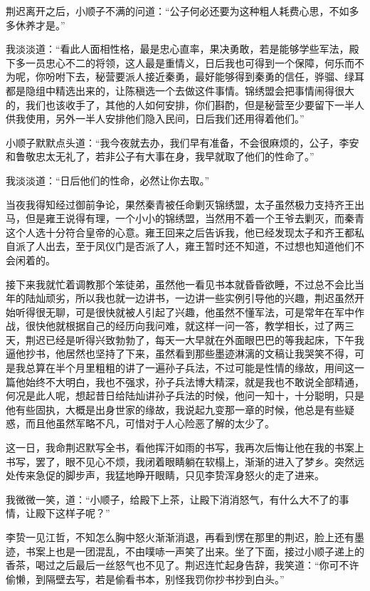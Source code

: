 荆迟离开之后，小顺子不满的问道：“公子何必还要为这种粗人耗费心思，不如多多休养才是。”

我淡淡道：“看此人面相性格，最是忠心直率，果决勇敢，若是能够学些军法，殿下多一员忠心不二的将领，这人最是重情义，日后我也可得到一个保障，何乐而不为呢，你吩咐下去，秘营要派人接近秦勇，最好能够得到秦勇的信任，骅骝、绿耳都是隐组中精选出来的，让陈稹选一个去做这件事情。锦绣盟会把事情闹得很大的，我们也该收手了，其他的人如何安排，你们斟酌，但是秘营至少要留下一半人供我使用，另外一半人安排他们隐入民间，日后我们还用得着他们。”

小顺子默默点头道：“我今夜就去办，我们早有准备，不会很麻烦的，公子，李安和鲁敬忠太无礼了，若非公子有大事在身，我早就取了他们的性命了。”

我淡淡道：“日后他们的性命，必然让你去取。”

当夜我得知经过御前争论，果然秦青被任命剿灭锦绣盟，太子虽然极力支持齐王出马，但是雍王说得有理，一个小小的锦绣盟，当然用不着一个王爷去剿灭，而秦青这个人选十分符合皇帝的心意。雍王回来之后告诉我，他已经发现太子和齐王都私自派了人出去，至于凤仪门是否派了人，雍王暂时还不知道，不过想也知道他们不会闲着的。

接下来我就忙着调教那个笨徒弟，虽然他一看见书本就昏昏欲睡，不过总不会比当年的陆灿顽劣，所以我也就一边讲书，一边讲一些实例引导他的兴趣，荆迟虽然开始听得很无聊，可是很快就被人引起了兴趣，他虽然不懂军法，可是常年在军中作战，很快他就根据自己的经历向我问难，就这样一问一答，教学相长，过了两三天，荆迟已经是听得兴致勃勃了，每天一大早就在外面眼巴巴的等我起床，下午我逼他抄书，他居然也坚持了下来，虽然看到那些墨迹淋漓的文稿让我哭笑不得，可是我总算在半个月里粗粗的讲了一遍孙子兵法，不过可能是性情的缘故，用间这一篇他始终不大明白，我也不强求，孙子兵法博大精深，就是我也不敢说全部精通，何况是此人呢，想起昔日给陆灿讲孙子兵法的时候，他问一知十，十分聪明，只是他有些固执，大概是出身世家的缘故，我说起九变那一章的时候，他总是有些疑惑，而且他虽然军略不凡，可惜对于人心险恶了解的太少了。

这一日，我命荆迟默写全书，看他挥汗如雨的书写，我再次后悔让他在我的书案上书写，罢了，眼不见心不烦，我闭着眼睛躺在软榻上，渐渐的进入了梦乡。突然远处传来急促的脚步声，我猛地睁开眼睛，只见李贽浑身怒火的走了进来。

我微微一笑，道：“小顺子，给殿下上茶，让殿下消消怒气，有什么大不了的事情，让殿下这样子呢？”

李贽一见江哲，不知怎么胸中怒火渐渐消退，再看到愣在那里的荆迟，脸上还有墨迹，书案上也是一团混乱，不由噗哧一声笑了出来。坐了下面，接过小顺子递上的香茶，喝过之后最后一丝怒气也不见了。荆迟连忙起身告辞，我笑道：“你可不许偷懒，到隔壁去写，若是偷看书本，别怪我罚你抄书抄到白头。”

